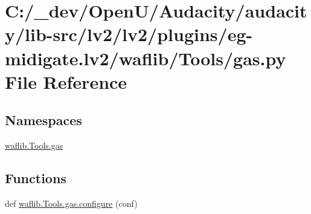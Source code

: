 \hypertarget{lv2_2plugins_2eg-midigate_8lv2_2waflib_2_tools_2gas_8py}{}\section{C\+:/\+\_\+dev/\+Open\+U/\+Audacity/audacity/lib-\/src/lv2/lv2/plugins/eg-\/midigate.lv2/waflib/\+Tools/gas.py File Reference}
\label{lv2_2plugins_2eg-midigate_8lv2_2waflib_2_tools_2gas_8py}
\subsection*{Namespaces}
\begin{DoxyCompactItemize}
\item 
 \hyperlink{namespacewaflib_1_1_tools_1_1gas}{waflib.\+Tools.\+gas}
\end{DoxyCompactItemize}
\subsection*{Functions}
\begin{DoxyCompactItemize}
\item 
def \hyperlink{namespacewaflib_1_1_tools_1_1gas_ad1cc79a9a3edafdd0c92e0198ba5f802}{waflib.\+Tools.\+gas.\+configure} (conf)
\end{DoxyCompactItemize}
